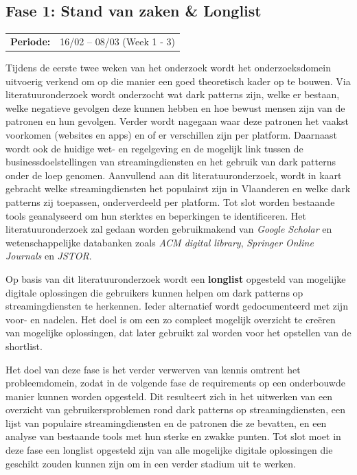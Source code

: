 \subsection{Fase 1: Stand van zaken \& Longlist}
\label{subsec:stand-van-zaken}

\begin{tabular}{ll}
    \hspace{0.3em} \textbf{Periode:} & 16/02 – 08/03 (Week 1 - 3)
\end{tabular}

\vspace{1em}

Tijdens de eerste twee weken van het onderzoek wordt het onderzoeksdomein uitvoerig verkend om op die manier een goed theoretisch kader op te bouwen. Via literatuuronderzoek wordt onderzocht wat dark patterns zijn, welke er bestaan, welke negatieve gevolgen deze kunnen hebben en hoe bewust mensen zijn van de patronen en hun gevolgen. Verder wordt nagegaan waar deze patronen het vaakst voorkomen (websites en apps) en of er verschillen zijn per platform. Daarnaast wordt ook de huidige wet- en regelgeving en de mogelijk link tussen de businessdoelstellingen van streamingdiensten en het gebruik van dark patterns onder de loep genomen. Aanvullend aan dit literatuuronderzoek, wordt in kaart gebracht welke streamingdiensten het populairst zijn in Vlaanderen en welke dark patterns zij toepassen, onderverdeeld per platform. Tot slot worden bestaande tools geanalyseerd om hun sterktes en beperkingen te identificeren. Het literatuuronderzoek zal gedaan worden gebruikmakend van \emph{Google Scholar} en wetenschappelijke databanken zoals \emph{ACM digital library}, \emph{Springer Online Journals} en \emph{JSTOR}.

\vspace{1em}

Op basis van dit literatuuronderzoek wordt een \textbf{longlist} opgesteld van mogelijke digitale oplossingen die gebruikers kunnen helpen om dark patterns op streamingdiensten te herkennen. Ieder alternatief wordt gedocumenteerd met zijn voor- en nadelen. Het doel is om een zo compleet mogelijk overzicht te creëren van mogelijke oplossingen, dat later gebruikt zal worden voor het opstellen van de shortlist.

\vspace{1em}

Het doel van deze fase is het verder verwerven van kennis omtrent het probleemdomein, zodat in de volgende fase de requirements op een onderbouwde manier kunnen worden opgesteld. Dit resulteert zich in het uitwerken van een overzicht van gebruikersproblemen rond dark patterns op streamingdiensten, een lijst van populaire streamingdiensten en de patronen die ze bevatten, en een analyse van bestaande tools met hun sterke en zwakke punten. Tot slot moet in deze fase een longlist opgesteld zijn van alle mogelijke digitale oplossingen die geschikt zouden kunnen zijn om in een verder stadium uit te werken.

